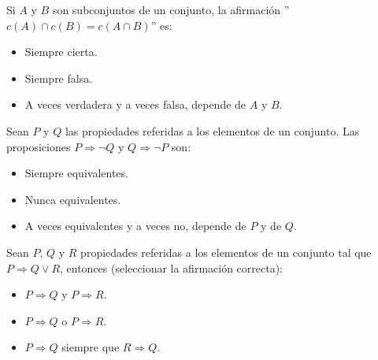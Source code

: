 \documentclass[12pt]{article}
\newcounter{ejercicio}[section] %
\newcounter{ejercicio}
\newcommand{\resetearcontador}{%
  \setcounter{ejercicio}{0} %
}
\begin{document}
    \begin{ejercicio}
        Si $A$ y $B$ son subconjuntos de un conjunto, la afirmación \newline ''$c(A) \cap c(B) = c(A \cap B)$'' es:
        \begin{itemize}
            \item Siempre cierta.
            \item Siempre falsa.
            \item A veces verdadera y a veces falsa, depende de $A$ y $B$.
        \end{itemize}
    \end{ejercicio}

    \begin{ejercicio}
        Sean $P$ y $Q$ las propiedades referidas a los elementos de un conjunto. Las proposiciones $P \Rightarrow \neg Q$ y $Q \Rightarrow \neg P$ son:
        \begin{itemize}
            \item Siempre equivalentes.
            \item Nunca equivalentes.
            \item A veces equivalentes y a veces no, depende de $P$ y de $Q$.
        \end{itemize}
    \end{ejercicio}

    \begin{ejercicio}
        Sean $P$, $Q$ y $R$ propiedades referidas a los elementos de un conjunto tal que $P \Rightarrow Q \lor R$, entonces (seleccionar la afirmación correcta):
        \begin{itemize}
            \item $P \Rightarrow Q$ y $P \Rightarrow R$.
            \item $P \Rightarrow Q$ o $P \Rightarrow R$.
            \item $P \Rightarrow Q$ siempre que $R \Rightarrow Q$.
        \end{itemize}
    \end{ejercicio}

    \newpage
    \ %
    \resetearcontador
    \newpage
\end{document}
